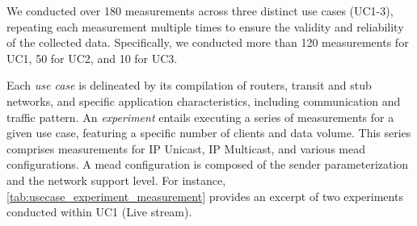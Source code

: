 We conducted over 180 measurements across three distinct use cases (UC1-3),
    repeating each measurement multiple times to ensure the validity and
    reliability of the collected data.
Specifically, we conducted more than 120 measurements for UC1, 50 for UC2, and
    10 for UC3.

Each \textit{use case} is delineated by its compilation of routers, transit and
    stub networks, and specific application characteristics, including
    communication and traffic pattern.
An \textit{experiment} entails executing a series of measurements for a given
    use case, featuring a specific number of clients and data volume.
This series comprises measurements for IP Unicast, IP Multicast, and various 
    \gls{mead} configurations.
A \gls{mead} configuration is composed of the sender parameterization and the 
    network support level.
For instance, \autoref{tab:usecase_experiment_measurement} provides an excerpt
    of two experiments conducted within UC1 (Live stream).

